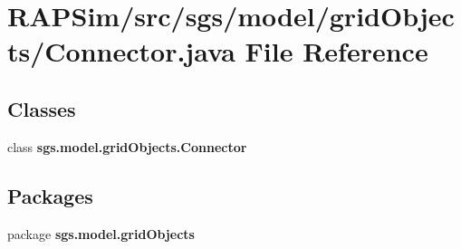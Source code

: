 \section{R\-A\-P\-Sim/src/sgs/model/grid\-Objects/\-Connector.java File Reference}
\label{_connector_8java}
\subsection*{Classes}
\begin{DoxyCompactItemize}
\item 
class {\bf sgs.\-model.\-grid\-Objects.\-Connector}
\end{DoxyCompactItemize}
\subsection*{Packages}
\begin{DoxyCompactItemize}
\item 
package {\bf sgs.\-model.\-grid\-Objects}
\end{DoxyCompactItemize}
